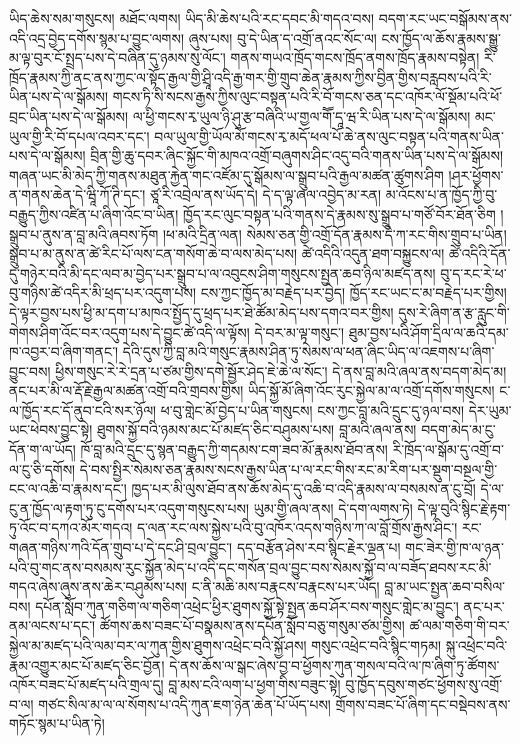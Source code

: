 \documentclass{article}
\begin{document}
ཡིད་ཆེས་སམ་གསུངས། མཐོང་ལགས། ཡིད་མི་ཆེས་པའི་རང་དབང་མི་གདའ་བས། བདག་རང་ཡང་བསྒོམས་ནས་འདི་འདྲ་བྱེད་དགོས་སྙམ་པ་བྱུང་ལགས། ཞུས་པས། བུ་དེ་ཡིན་ད་འགྲོ་ནའང་སོང་ལ། ངས་ཁྱོད་ལ་ཆོས་རྣམས་སྒྱུ་མ་ལྟ་བུར་ངོ་སྤྲད་པས་དེ་བཞིན་དུ་ཉམས་སུ་ལོང་། གནས་གཡའ་ཁྲོད་གངས་ཁྲོད་ནགས་ཁྲོད་རྣམས་བསྟེན། རི་ཁྲོད་རྣམས་ཀྱི་ནང་ནས་ཀྱང་ལ་སྟོད་རྒྱལ་གྱི་ཤྲཱི་འདི་རྒྱ་གར་གྱི་གྲུབ་ཆེན་རྣམས་ཀྱིས་བྱིན་གྱིས་བརླབས་པའི་རི་ཡིན་པས་དེ་ལ་སྒོམས། གངས་ཏི་སི་སངས་རྒྱས་ཀྱིས་ལུང་བསྟན་པའི་རི་བོ་གངས་ཅན་དང་འཁོར་ལོ་སྡོམ་པའི་ཕོ་བྲང་ཡིན་པས་དེ་ལ་སྒོམས། ལ་ཕྱི་གངས་རྭ་ཡུལ་ཉི་ཤུ་རྩ་བཞིའི་ཡ་གྱལ་གཽ་དཱ་ཝ་རི་ཡིན་པས་དེ་ལ་སྒོམས། མང་ཡུལ་གྱི་རི་བོ་དཔལ་འབར་དང་། བལ་ཡུལ་གྱི་ཡོལ་མོ་གངས་རྭ་མདོ་ཕལ་པོ་ཆེ་ནས་ལུང་བསྟན་པའི་གནས་ཡིན་པས་དེ་ལ་སྒོམས། བྲིན་གྱི་ཆུ་དབར་ཞིང་སྐྱོང་གི་མཁའ་འགྲོ་བཞུགས་ཤིང་འདུ་བའི་གནས་ཡིན་པས་དེ་ལ་སྒོམས། གཞན་ཡང་མི་མེད་ཀྱི་གནས་མཐུན་རྐྱེན་གང་འཛོམ་དུ་སྒོམས་ལ་སྒྲུབ་པའི་རྒྱལ་མཚན་ཚུགས་ཤིག །ཤར་ཕྱོགས་ན་གནས་ཆེན་དེ་ཝཱི་ཀོ་ཊི་དང་། ཙཱ་རི་འབྲེལ་ནས་ཡོད་དེ། དེ་ད་ལྟ་ཞལ་འབྱེད་མ་རན། མ་འོངས་པ་ན་ཁྱོད་ཀྱི་བུ་བརྒྱུད་ཀྱིས་འཛིན་པ་ཞིག་འོང་བ་ཡིན། ཁྱོད་རང་ལུང་བསྟན་པའི་གནས་དེ་རྣམས་སུ་སྒྲུབ་པ་གཙོ་བོར་ཐོན་ཅིག །སྒྲུབ་པ་ནུས་ན་བླ་མའི་ཞབས་ཏོག །ཕ་མའི་དྲིན་ལན། སེམས་ཅན་གྱི་འགྲོ་དོན་རྣམས་དེ་ཀ་རང་གིས་གྲུབ་པ་ཡིན། སྒྲུབ་པ་མ་ནུས་ན་ཚེ་རིང་པོ་ལས་ངན་གསོག་ཆེ་བ་ལས་མེད་པས། ཚེ་འདིའི་འདུན་ཐག་བསྐྱུངས་ལ། ཚེ་འདིའི་དོན་དུ་གཉེར་བའི་མི་དང་ལབ་མ་བྱེད་པར་སྒྲུབ་པ་ལ་འབུངས་ཤིག་གསུངས་སྤྱན་ཆབ་ཉིལ་མཛད་ནས། བུ་ད་རང་རེ་ཕ་བུ་གཉིས་ཚེ་འདིར་མི་ཕྲད་པར་འདུག་པས། ངས་ཀྱང་ཁྱོད་མ་བརྗེད་པར་བྱེད། ཁྱོད་རང་ཡང་ང་མ་བརྗེད་པར་གྱིས། དེ་ལྟར་བྱས་པས་ཕྱི་མ་དག་པ་མཁའ་སྤྱོད་དུ་ཕྲད་པར་ཐེ་ཚོམ་མེད་པས་དགའ་བར་གྱིས། དུས་རེ་ཞིག་ན་རྩ་རླུང་གི་གེགས་ཤིག་འོང་བར་འདུག་པས་དེ་བྱུང་ཚེ་འདི་ལ་ལྟོས། དེ་བར་མ་ལྟ་གསུང་། ཐུམ་བྱས་པའི་ཤོག་དྲིལ་ལ་ཆའི་དམ་ཁ་འབྱར་བ་ཞིག་གནང་། དེའི་དུས་ཀྱི་བླ་མའི་གསུང་རྣམས་ཤིན་ཏུ་སེམས་ལ་ཕན་ཞིང་ཡིད་ལ་འཇགས་པ་ཞིག་བྱུང་བས། ཕྱིས་གསུང་རེ་རེ་དྲན་པ་ཙམ་གྱིས་དགེ་སྦྱོར་ཤེད་ཇེ་ཆེ་ལ་སོང་། དེ་ནས་བླ་མའི་ཞལ་ནས་བདག་མེད་མ། ནང་པར་མི་ལ་རྡོ་རྗེ་རྒྱལ་མཚན་འགྲོ་བའི་གྲབས་གྱིས། ཡིད་སྐྱོ་མོ་ཞིག་འོང་རུང་སྐྱེལ་མ་ལ་འགྲོ་དགོས་གསུངས། ང་ལ་ཁྱོད་རང་དོ་ནུབ་ངའི་སར་ཉོལ། ཕ་བུ་གླེང་མོ་བྱེད་པ་ཡིན་གསུངས། ངས་ཀྱང་བླ་མའི་དྲུང་དུ་ཉལ་བས། དེར་ཡུམ་ཡང་ཕེབས་བྱུང་སྟེ། ཐུགས་སྐྱོ་བའི་ཉམས་མང་པོ་མཛད་ཅིང་བཤུམས་པས། བླ་མའི་ཞལ་ནས། བདག་མེད་མ་ངུ་དོན་ག་ལ་ཡོད། ཁོ་བླ་མའི་དྲུང་དུ་སྙན་བརྒྱུད་ཀྱི་གདམས་ངག་ཟབ་མོ་རྣམས་ཐོབ་ནས། རི་ཁྲོད་ལ་སྒོམ་དུ་འགྲོ་བ་ལ་ངུ་ཅི་དགོས། དེ་བས་སྤྱིར་སེམས་ཅན་རྣམས་སངས་རྒྱས་ཡིན་པ་ལ་རང་གིས་རང་མ་རིག་པར་སྡུག་བསྔལ་གྱི་ངང་ལ་འཆི་བ་རྣམས་དང་། ཁྱད་པར་མི་ལུས་ཐོབ་ནས་ཆོས་མེད་དུ་འཆི་བ་འདི་རྣམས་ལ་བསམས་ན་ངུ་བྲོ། དེ་ལ་ངུ་ན་ཁྱོད་ལ་རྟག་ཏུ་ངུ་དགོས་པར་འདུག་གསུངས་པས། ཡུམ་གྱི་ཞལ་ནས། དེ་དག་ལགས་ཏེ། དེ་ལྟ་བུའི་སྙིང་རྗེ་རྟག་ཏུ་འོང་བ་དཀའ་མོར་གདའ། ད་ལན་རང་ལས་སྐྱེས་པའི་བུ་འཁོར་འདས་གཉིས་ཀ་ལ་བློ་གྲོས་རྒྱས་ཤིང་། རང་གཞན་གཉིས་ཀའི་དོན་གྲུབ་པ་དེ་དང་ཤི་བྲལ་བྱུང་། དད་བརྩོན་ཤེས་རབ་སྙིང་རྗེར་ལྡན་པ། གང་ཟེར་གྱི་ཁ་ལ་ཉན་པའི་བུ་གང་ནས་བསམས་རུང་སྐྱོན་མེད་པ་འདི་དང་གསོན་བྲལ་བྱུང་བས་སེམས་སྐྱོ་བ་ལ་བཟོད་ཐབས་རང་མི་གདའ་ཞེས་ཞུས་ནས་ཆེར་བཤུམས་པས། ང་ནི་མཆི་མས་བརྣངས་བརྣངས་པར་ཡོད། བླ་མ་ཡང་སྤྱན་ཆབ་བསིལ་བས། དཔོན་སློབ་ཀུན་གཅིག་ལ་གཅིག་འཕྲེང་ཕྱིར་ཐུགས་སྐྱོ་སྟེ་སྤྱན་ཆབ་ཤོར་བས་གསུང་གླེང་མ་བྱུང་། ནང་པར་ནམ་ལངས་པ་དང་། ཚོགས་ཆས་བཟང་པོ་བསྣམས་ནས་དཔོན་སློབ་བཅུ་གསུམ་ཙམ་གྱིས། ཚ་ལམ་གཅིག་གི་བར་སྐྱེལ་མ་མཛད་པའི་ལམ་བར་ལ་ཀུན་གྱིས་ཐུགས་འཕྲེང་བའི་སྐྱོ་ཤས། གསུང་འཕྲེང་བའི་སྙིང་གཏམ། སྐུ་འཕྲེང་བའི་རྣམ་འགྱུར་མང་པོ་མཛད་ཅིང་བྱོན། དེ་ནས་ཆོས་ལ་སྒང་ཞེས་བྱ་བ་ཕྱོགས་ཀུན་གསལ་བའི་ལ་ཁ་ཞིག་ཏུ་ཚོགས་འཁོར་བཟང་པོ་མཛད་པའི་གྲལ་དུ། བླ་མས་ངའི་ལག་པ་ཕྱག་གིས་བཟུང་སྟེ། བུ་ཁྱོད་དབུས་གཙང་ཕྱོགས་སུ་འགྲོ་བ་ལ། གཙང་སིལ་མ་ལ་ལ་སོགས་པ་འདི་ཀུན་ཇག་ཉེན་ཆེན་པོ་ཡོད་པས། གྲོགས་བཟང་པོ་ཞིག་དང་བསྡེབས་ནས་གཏོང་སྙམ་པ་ཡིན་ཏེ། 
\end{document}
